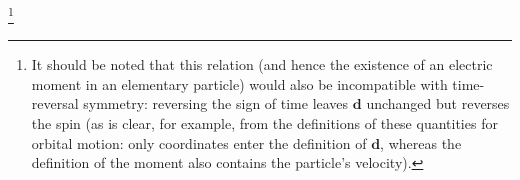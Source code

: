 \footnote{It should be noted that this relation (and hence the existence of an electric moment in an elementary particle) would also be incompatible with time-reversal symmetry: reversing the sign of time leaves $\mathbf d$ unchanged but reverses the spin (as is clear, for example, from the definitions of these quantities for orbital motion: only coordinates enter the definition of $\mathbf d$, whereas the definition of the moment also contains the particle's velocity).}
